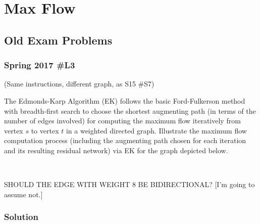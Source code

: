 \section{Max Flow}

\subsection{Old Exam Problems}

\subsubsection{Spring 2017 \#L3}

(Same instructions, different graph, as S15 \#S7)

	The Edmonds-Karp Algorithm (EK) follows the basic Ford-Fulkerson method with breadth-first search to choose the shortest augmenting path (in terms of the number of edges involved) for computing the maximum flow iteratively from vertex $s$ to vertex $t$ in a weighted directed graph.  Illustrate the maximum flow computation process (including the augmenting path chosen for each iteration and its resulting residual network) via EK for the graph depicted below.  
	
\
	
\hfil{}

	SHOULD THE EDGE WITH WEIGHT 8 BE BIDIRECTIONAL?  [I'm going to assume not.]
	
\subsubsection{Solution}

